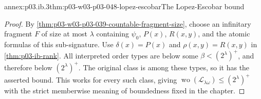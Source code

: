 \begin{annexitem}{annex:p03.ib.3}{thm:p03-w03-p03-048-lopez-escobar}{The Lopez-Escobar bound}
\begin{proof}
By \cref{thm:p03-w03-p03-039-countable-fragment-size}, choose
an infinitary fragment \(F\) of size at most \(\lambda\)
containing \(\psi_0\), \(P(x)\), \(R(x,y)\), and the atomic
formulas of this sub-signature. Use
\(\delta(x)=P(x)\) and \(\rho(x,y)=R(x,y)\) in
\cref{thm:p03-ib-rank}. All interpreted order types are below
some \(\beta<(2^\lambda)^+\), and therefore below
\((2^\lambda)^+\). The original class is among these types,
so it has the asserted bound. This works for every such class,
giving \(\operatorname{wo}(\mathcal L_{\lambda\omega})
\leq(2^\lambda)^+\) with the strict memberwise meaning of
boundedness fixed in the chapter.
\end{proof}
\end{annexitem}
